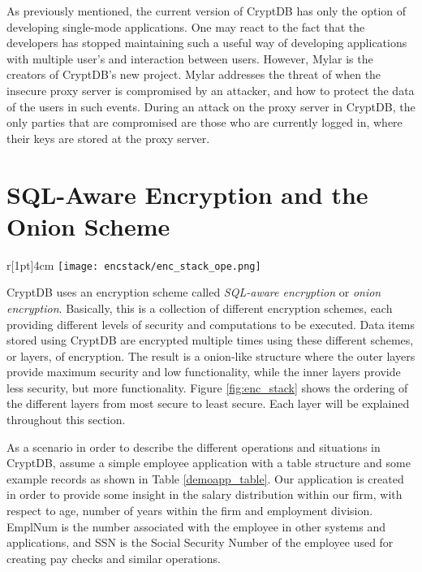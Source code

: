 As previously mentioned, the current version of CryptDB has only the option of developing single-mode applications. One may react to the fact that the developers has stopped maintaining such a useful way of developing applications with multiple user's and interaction between users. However, Mylar \cite{mylar_homepage} is the creators of CryptDB's new project. Mylar addresses the threat of when the insecure proxy server is compromised by an attacker, and how to protect the data of the users in such events. During an attack on the proxy server in CryptDB, the only parties that are compromised are those who are currently logged in, where their keys are stored at the proxy server.



\section{SQL-Aware Encryption and the Onion Scheme}
\label{sec:sqlaware}

\begin{wrapfigure}[19]{r}[1pt]{4cm}
\centering
\texttt{[image: encstack/enc\_stack\_ope.png]}
\caption{Ordering of the different encryption layers based on their security}
\label{fig:enc_stack}
\end{wrapfigure}

CryptDB uses an encryption scheme called \emph{SQL-aware encryption} or \textit{onion encryption}. Basically, this is a collection of different encryption schemes, each providing different levels of security and computations to be executed. Data items stored using CryptDB are encrypted multiple times using these different schemes, or layers, of encryption. The result is a onion-like structure where the outer layers provide maximum security and low functionality, while the inner layers provide less security, but more functionality. Figure \ref{fig:enc_stack} shows the ordering of the different layers from most secure to least secure. Each layer will be explained throughout this section.

As a scenario in order to describe the different operations and situations in CryptDB, assume a simple employee application with a table structure and some example records as shown in Table \ref{demoapp_table}. Our application is created in order to provide some insight in the salary distribution within our firm, with respect to age, number of years within the firm and employment division. EmplNum is the number associated with the employee in other systems and applications, and SSN is the Social Security Number of the employee used for creating pay checks and similar operations.

